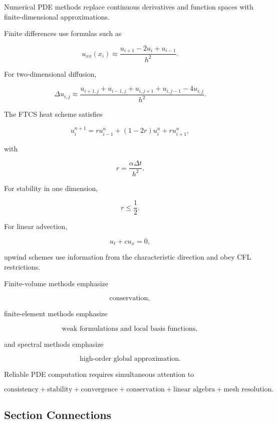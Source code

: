 Numerical PDE methods replace continuous derivatives and function spaces
with finite-dimensional approximations.

Finite differences use formulas such as

\[
\boxed{
u_{xx}(x_i)
\approx
\frac{
u_{i+1}-2u_i+u_{i-1}
}{
h^2
}.
}
\]

For two-dimensional diffusion,

\[
\boxed{
\Delta u_{i,j}
\approx
\frac{
u_{i+1,j}
+
u_{i-1,j}
+
u_{i,j+1}
+
u_{i,j-1}
-
4u_{i,j}
}{
h^2
}.
}
\]

The FTCS heat scheme satisfies

\[
\boxed{
u_i^{n+1}
=
r u_{i-1}^n
+
(1-2r)u_i^n
+
r u_{i+1}^n,
}
\]

with

\[
\boxed{
r
=
\frac{
\alpha\Delta t
}{
h^2
}.
}
\]

For stability in one dimension,

\[
\boxed{
r\leq\frac12.
}
\]

For linear advection,

\[
\boxed{
u_t+cu_x=0,
}
\]

upwind schemes use information from the characteristic direction and obey
CFL restrictions.

Finite-volume methods emphasize

\[
\boxed{
\text{conservation},
}
\]

finite-element methods emphasize

\[
\boxed{
\text{weak formulations and local basis functions},
}
\]

and spectral methods emphasize

\[
\boxed{
\text{high-order global approximation}.
}
\]

Reliable PDE computation requires simultaneous attention to

\[
\boxed{
\text{consistency}
+
\text{stability}
+
\text{convergence}
+
\text{conservation}
+
\text{linear algebra}
+
\text{mesh resolution}.
}
\]

\subsection{Section Connections}
\label{subsec:numerical-pde-connections}


